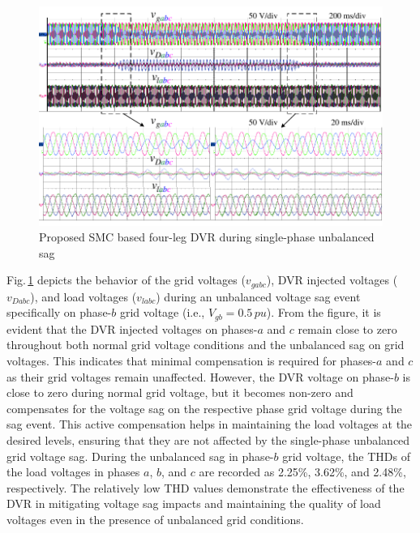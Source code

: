 \begin{figure}[t!]   
	\centering
	\includegraphics[scale=1]{figures/Chapter_5/Mine/UnbalancedSag1_No_IL} 
	\caption{Proposed SMC based four-leg DVR during single-phase unbalanced sag} %
	\label{fig5.9}
\end{figure}

Fig.\,\ref{fig5.9} depicts the behavior of the grid voltages ($v_{gabc}$), DVR injected voltages ($v_{Dabc}$), and load voltages ($v_{labc}$) during an unbalanced voltage sag event specifically on phase-$b$ grid voltage (i.e., $V_{gb}=0.5\,\si{pu}$). From the figure, it is evident that the DVR injected voltages on phases-$a$ and $c$ remain close to zero throughout both normal grid voltage conditions and the unbalanced sag on grid voltages. This indicates that minimal compensation is required for phases-$a$ and $c$ as their grid voltages remain unaffected.
However, the DVR voltage on phase-$b$ is close to zero during normal grid voltage, but it becomes non-zero and compensates for the voltage sag on the respective phase grid voltage during the sag event. This active compensation helps in maintaining the load voltages at the desired levels, ensuring that they are not affected by the single-phase unbalanced grid voltage sag.
During the unbalanced sag in phase-$b$ grid voltage, the THDs of the load voltages in phases $a$, $b$, and $c$ are recorded as 2.25\%, 3.62\%, and 2.48\%, respectively. The relatively low THD values demonstrate the effectiveness of the DVR in mitigating voltage sag impacts and maintaining the quality of load voltages even in the presence of unbalanced grid conditions.

